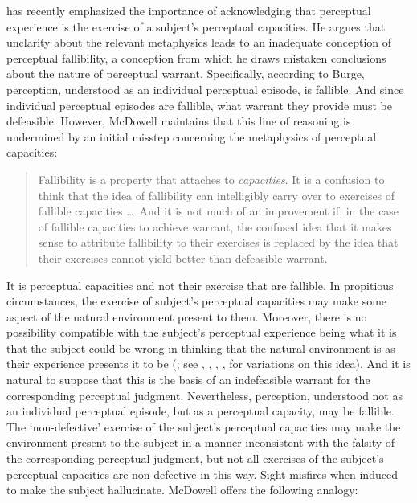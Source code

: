 \documentclass[12pt]{article}
\begin{document}
\citet{McDowell:2010fk} has recently emphasized the importance of acknowledging that perceptual experience is the exercise of a subject's perceptual capacities. He argues that unclarity about the relevant metaphysics leads \citet{Burge:2005uq} to an inadequate conception of perceptual fallibility, a conception from which he draws mistaken conclusions about the nature of perceptual warrant. Specifically, according to Burge, perception, understood as an individual perceptual episode, is fallible. And since individual perceptual episodes are fallible, what warrant they provide must be defeasible. However, McDowell maintains that this line of reasoning is undermined by an initial misstep concerning the metaphysics of perceptual capacities:
\begin{quote}
	Fallibility is a property that attaches to \emph{capacities}. It is a confusion to think that the idea of fallibility can intelligibly carry over to exercises of fallible capacities \ldots\ And it is not much of an improvement if, in the case of fallible capacities to achieve warrant, the confused idea that it makes sense to attribute fallibility to their exercises is replaced by the idea that their exercises cannot yield better than defeasible warrant. \citep[245]{McDowell:2010fk}
\end{quote}
It is perceptual capacities and not their exercise that are fallible. In propitious circumstances, the exercise of subject's perceptual capacities may make some aspect of the natural environment present to them. Moreover, there is no possibility compatible with the subject's perceptual experience being what it is that the subject could be wrong in thinking that the natural environment is as their experience presents it to be (\citealt[245]{McDowell:2010fk}; see \citealt{Brewer:2011ks},  \citealt{Johnston:2006uq}, \citealt{Kalderon:2011fk}, \citealt{Kalderon:2010fk}, \citealt{Travis:2005kx} for variations on this idea). And it is natural to suppose that this is the basis of an indefeasible warrant for the corresponding perceptual judgment. Nevertheless, perception, understood not as an individual perceptual episode, but as a perceptual capacity, may be fallible. The `non-defective' exercise of the subject's perceptual capacities may make the environment present to the subject in a manner inconsistent with the falsity of the corresponding perceptual judgment, but not all exercises of the subject's perceptual capacities are non-defective in this way. Sight misfires when induced to make the subject hallucinate. McDowell offers the following analogy:
\end{document}
